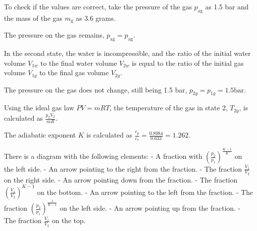 To check if the values are correct, take the pressure of the gas \( p_{\text{ag}} \) as 1.5 bar and the mass of the gas \( m_{\text{g}} \) as 3.6 grams.

The pressure on the gas remains, \( p_{\text{ag}} = p_{\text{ag}} \).

In the second state, the water is incompressible, and the ratio of the initial water volume \( V_{1w} \) to the final water volume \( V_{2w} \) is equal to the ratio of the initial gas volume \( V_{1g} \) to the final gas volume \( V_{2g} \).

The pressure on the gas does not change, still being 1.5 bar, \( p_{2g} = p_{1g} = 1.5 \text{bar} \).

Using the ideal gas law \( PV = mRT \), the temperature of the gas in state 2, \( T_{2g} \), is calculated as \( \frac{p_{2} V_{2}}{mR} \).

The adiabatic exponent \( K \) is calculated as \( \frac{c_p}{c_v} = \frac{0.8984}{0.633} = 1.262 \).

There is a diagram with the following elements:
- A fraction with \( \left(\frac{p_2}{p_1}\right)^{\frac{K-1}{K}} \) on the left side.
- An arrow pointing to the right from the fraction.
- The fraction \( \frac{V_1}{V_2} \) on the right side.
- An arrow pointing down from the fraction.
- The fraction \( \left(\frac{V_1}{V_2}\right)^{K-1} \) on the bottom.
- An arrow pointing to the left from the fraction.
- The fraction \( \left(\frac{p_2}{p_1}\right)^{\frac{1}{K-1}} \) on the left side.
- An arrow pointing up from the fraction.
- The fraction \( \frac{V_1}{V_2} \) on the top.